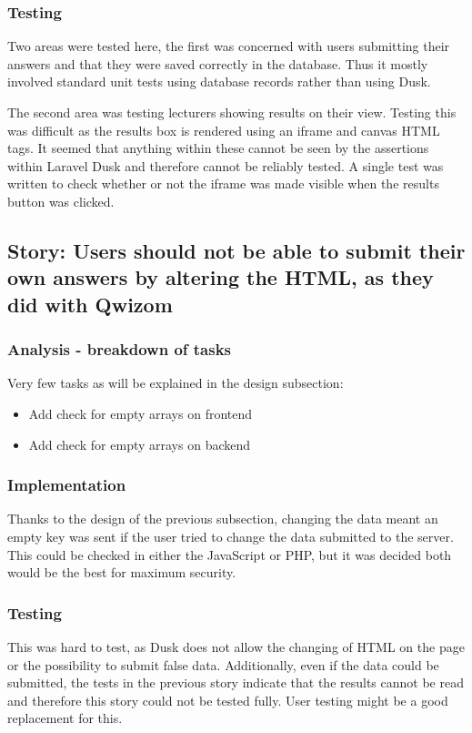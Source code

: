 \subsubsection{Testing}
Two areas were tested here, the first was concerned with users submitting their answers and that they were saved correctly in the database. Thus it mostly involved standard unit tests using database records rather than using Dusk. 

The second area was testing lecturers showing results on their view. Testing this was difficult as the results box is rendered using an iframe and canvas HTML tags. It seemed that anything within these cannot be seen by the assertions within Laravel Dusk and therefore cannot be reliably tested. A single test was written to check whether or not the iframe was made visible when the results button was clicked.
\newpage

\subsection{Story: Users should not be able to submit their own answers by altering the HTML, as they did with Qwizom}
\subsubsection{Analysis - breakdown of tasks}
Very few tasks as will be explained in the design subsection:
\begin{itemize}
	\item Add check for empty arrays on frontend
	\item Add check for empty arrays on backend
\end{itemize}
\subsubsection{Implementation}
Thanks to the design of the previous subsection, changing the data meant an empty key was sent if the user tried to change the data submitted to the server. This could be checked in either the JavaScript or PHP, but it was decided both would be the best for maximum security. 
\subsubsection{Testing}
This was hard to test, as Dusk does not allow the changing of HTML on the page or the possibility to submit false data. Additionally, even if the data could be submitted, the tests in the previous story indicate that the results cannot be read and therefore this story could not be tested fully. User testing might be a good replacement for this.
\newpage

